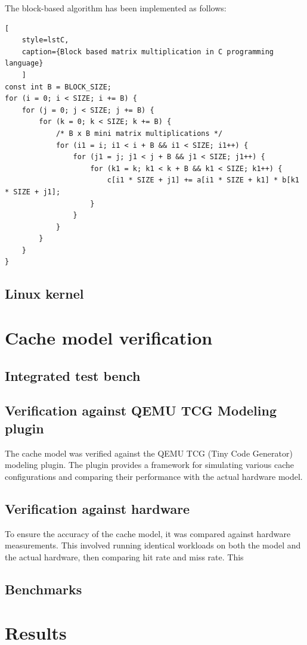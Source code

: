 \noindent The block-based algorithm has been implemented as follows:
\begin{center}
\centering
\begin{minipage}{\linewidth}
\begin{lstlisting}[
	style=lstC,
    caption={Block based matrix multiplication in C programming language}
    ]
const int B = BLOCK_SIZE;
for (i = 0; i < SIZE; i += B) {
	for (j = 0; j < SIZE; j += B) {
		for (k = 0; k < SIZE; k += B) {
			/* B x B mini matrix multiplications */
			for (i1 = i; i1 < i + B && i1 < SIZE; i1++) {
				for (j1 = j; j1 < j + B && j1 < SIZE; j1++) {
					for (k1 = k; k1 < k + B && k1 < SIZE; k1++) {
						c[i1 * SIZE + j1] += a[i1 * SIZE + k1] * b[k1 * SIZE + j1];
					}
				}
			}
		}
	}
}
\end{lstlisting}
\end{minipage}
\end{center}

\subsection{Linux kernel}

\section{Cache model verification}

\subsection{Integrated test bench}

\subsection{Verification against QEMU TCG Modeling plugin}
The cache model was verified against the QEMU TCG (Tiny Code Generator) modeling plugin. The plugin provides a framework for simulating various cache configurations and comparing
their performance with the actual hardware model.

\subsection{Verification against hardware}
To ensure the accuracy of the cache model, it was compared against hardware measurements. This involved running identical workloads on both the model and the actual hardware, then
comparing hit rate and miss rate. This 

\subsection{Benchmarks}


\section{Results}
